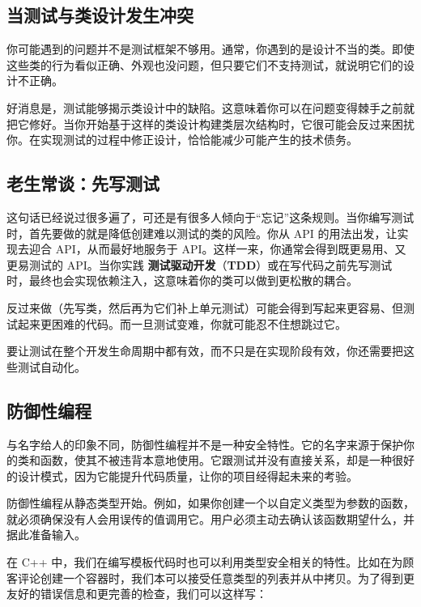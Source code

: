 \subsection{当测试与类设计发生冲突}

\label{idx:869}
你可能遇到的问题并不是测试框架不够用。通常，你遇到的是设计不当的类。即使这些类的行为看似正确、外观也没问题，但只要它们不支持测试，就说明它们的设计不正确。

好消息是，测试能够揭示类设计中的缺陷。这意味着你可以在问题变得棘手之前就把它修好。当你开始基于这样的类设计构建类层次结构时，它很可能会反过来困扰你。在实现测试的过程中修正设计，恰恰能减少可能产生的技术债务。

\subsection{老生常谈：先写测试}

\label{idx:870}
\label{idx:871}
这句话已经说过很多遍了，可还是有很多人倾向于“忘记”这条规则。当你编写测试时，首先要做的就是降低创建难以测试的类的风险。你从 API 的用法出发，让实现去迎合 API，从而最好地服务于 API。这样一来，你通常会得到既更易用、又更易测试的 API。当你实践 \textbf{测试驱动开发}（\textbf{TDD}）或在写代码之前先写测试时，最终也会实现依赖注入，这意味着你的类可以做到更松散的耦合。

反过来做（先写类，然后再为它们补上单元测试）可能会得到写起来更容易、但测试起来更困难的代码。而一旦测试变难，你就可能忍不住想跳过它。

要让测试在整个开发生命周期中都有效，而不只是在实现阶段有效，你还需要把这些测试自动化。

\subsection{防御性编程}

\label{idx:872}
\label{idx:873}
与名字给人的印象不同，防御性编程并不是一种安全特性。它的名字来源于保护你的类和函数，使其不被违背本意地使用。它跟测试并没有直接关系，却是一种很好的设计模式，因为它能提升代码质量，让你的项目经得起未来的考验。

防御性编程从静态类型开始。例如，如果你创建一个以自定义类型为参数的函数，就必须确保没有人会用误传的值调用它。用户必须主动去确认该函数期望什么，并据此准备输入。

\label{idx:874}
在 C++ 中，我们在编写模板代码时也可以利用类型安全相关的特性。比如在为顾客评论创建一个容器时，我们本可以接受任意类型的列表并从中拷贝。为了得到更友好的错误信息和更完善的检查，我们可以这样写：

